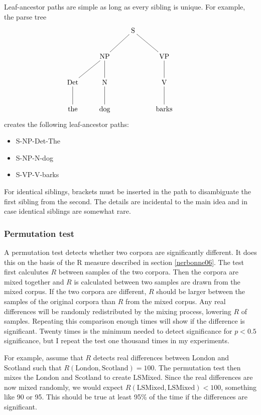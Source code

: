 \documentclass[11pt]{article}
\begin{document}
Leaf-ancestor paths are simple as long as every sibling is unique. For
example, the parse tree
\[\xymatrix{
  &&\textrm{S} \ar@{-}[dl] \ar@{-}[dr] &&\\
  &\textrm{NP} \ar@{-}[d] \ar@{-}[dl] &&\textrm{VP} \ar@{-}[d]\\
  \textrm{Det} \ar@{-}[d] & \textrm{N} \ar@{-}[d] && \textrm{V} \ar@{-}[d] \\
\textrm{the}& \textrm{dog} && \textrm{barks}\\}
\]
creates the following leaf-ancestor paths:

\begin{itemize}
\item S-NP-Det-The
\item S-NP-N-dog
\item S-VP-V-barks
\end{itemize}

For identical siblings, brackets must be inserted in the path to
disambiguate the first sibling from the second. The details are
incidental to the main idea and in case identical siblings are
somewhat rare.

\subsubsection{Permutation test}
\label{permutationtest}

A permutation test detects whether two corpora are significantly
different. It does this on the basis of the R measure described in
section \ref{nerbonne06}. The test first calculutes $R$ between
samples of the two corpora. Then the corpora are mixed together and
$R$ is calculated between two samples are drawn from the mixed
corpus. If the two corpora are different, $R$ should be larger between
the samples of the original corpora than $R$ from the mixed
corpus. Any real differences will be randomly redistributed by the
mixing process, lowering $R$ of samples. Repeating this comparison
enough times will show if the difference is significant. Twenty times
is the minimum needed to detect significance for $p < 0.5$
significance, but I repeat the test one thousand times in my
experiments.

For example, assume that $R$ detects real differences between London
and Scotland such that $R(\textrm{London},\textrm{Scotland}) =
100$. The permutation test then mixes the London and Scotland to
create LSMixed. Since the real differences are now mixed randomly, we
would expect $R(\textrm{LSMixed}, \textrm{LSMixed}) < 100$, something
like 90 or 95. This should be true at least 95\% of the time if the
differences are significant.
\end{document}
